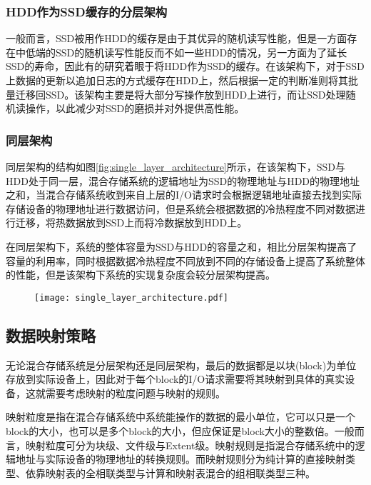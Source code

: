 \subsubsection{HDD作为SSD缓存的分层架构}

一般而言，SSD被用作HDD的缓存是由于其优异的随机读写性能，但是一方面存在中低端的SSD的随机读写性能反而不如一些HDD的情况，另一方面为了延长SSD的寿命，因此有的研究着眼于将HDD作为SSD的缓存\cite{soundararajan2010extending, yang2011hybrid, mao2012hpda}。在该架构下，对于SSD上数据的更新以追加日志的方式缓存在HDD上，然后根据一定的判断准则将其批量迁移回SSD。该架构主要是将大部分写操作放到HDD上进行，而让SSD处理随机读操作，以此减少对SSD的磨损并对外提供高性能。

\subsubsection{同层架构}

同层架构的结构如图\ref{fig:single_layer_architecture}所示，在该架构下，SSD与HDD处于同一层，混合存储系统的逻辑地址为SSD的物理地址与HDD的物理地址之和，当混合存储系统收到来自上层的I/O请求时会根据逻辑地址直接去找到实际存储设备的物理地址进行数据访问，但是系统会根据数据的冷热程度不同对数据进行迁移，将热数据放到SSD上而将冷数据放到HDD上。

在同层架构下，系统的整体容量为SSD与HDD的容量之和，相比分层架构提高了容量的利用率，同时根据数据冷热程度不同放到不同的存储设备上提高了系统整体的性能，但是该架构下系统的实现复杂度会较分层架构提高。

\begin{figure}[!htp]
    \centering
    \texttt{[image: single\_layer\_architecture.pdf]}
\end{figure}

\subsection{数据映射策略}

无论混合存储系统是分层架构还是同层架构，最后的数据都是以块(block)为单位存放到实际设备上，因此对于每个block的I/O请求需要将其映射到具体的真实设备，这就需要考虑映射的粒度问题与映射的规则。

映射粒度是指在混合存储系统中系统能操作的数据的最小单位，它可以只是一个block的大小，也可以是多个block的大小，但应保证是block大小的整数倍。一般而言，映射粒度可分为块级、文件级与Extent级。映射规则是指混合存储系统中的逻辑地址与实际设备的物理地址的转换规则。而映射规则分为纯计算的直接映射类型、依靠映射表的全相联类型与计算和映射表混合的组相联类型三种。

